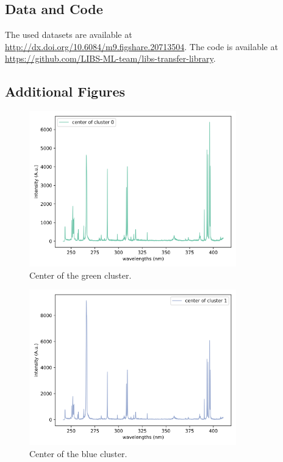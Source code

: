 \documentclass[preprint,11pt]{elsarticle}
\begin{document}
\subsection{Data and Code}
\noindent
The used datasets are available at \url{http://dx.doi.org/10.6084/m9.figshare.20713504}.
The code is available at \url{https://github.com/LIBS-ML-team/libs-transfer-library}.

\subsection{Additional Figures}

\begin{figure}[!htb]
    \centering
    \includegraphics[width=0.8\textwidth]{cluster_center_0.png}
    \caption{Center of the green cluster.}
\end{figure}

\begin{figure}[!htb]
    \centering
    \includegraphics[width=0.8\textwidth]{cluster_center_1.png}
    \caption{Center of the blue cluster.}
\end{figure}
\end{document}
